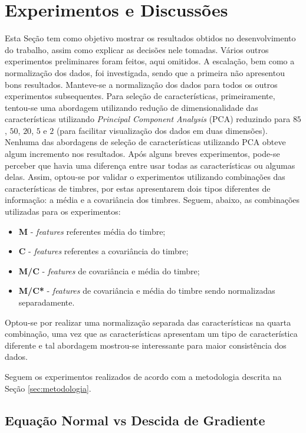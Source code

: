 \documentclass[conference]{IEEEtran}
\begin{document}
\section{Experimentos e Discussões} \label{sec:exp}

Esta Seção tem como objetivo mostrar os resultados obtidos no desenvolvimento do trabalho, assim como explicar as decisões nele tomadas. Vários outros experimentos preliminares foram feitos, aqui omitidos. A escalação, bem como a normalização dos dados, foi investigada, sendo que a primeira não apresentou bons resultados. Manteve-se a normalização dos dados para todos os outros experimentos subsequentes. Para seleção de características, primeiramente, tentou-se uma abordagem utilizando redução de dimensionalidade das características utilizando \textit{Principal Component Analysis} (PCA) reduzindo para $85$, $50$, $20$, $5$ e $2$ (para facilitar visualização dos dados em duas dimensões). Nenhuma das abordagens de seleção de características utilizando PCA obteve algum incremento nos resultados. Após alguns breves experimentos, pode-se perceber que havia uma diferença entre usar todas as características ou algumas delas. Assim, optou-se por validar o experimentos utilizando combinações das características de timbres, por estas apresentarem dois tipos diferentes de informação: a média e a covariância dos timbres. Seguem, abaixo, as combinações utilizadas para os experimentos:

\begin{itemize}
	\item \textbf{M} - \emph{features} referentes média do timbre;
	\item \textbf{C} - \emph{features} referentes a covariância do timbre;
	\item \textbf{M/C} - \emph{features} de covariância e média do timbre;
	\item \textbf{M/C*} - \emph{features} de covariância e média do timbre sendo normalizadas separadamente.
\end{itemize}

Optou-se por realizar uma normalização separada das características na quarta combinação, uma vez que as características apresentam um tipo de característica diferente e tal abordagem mostrou-se interessante para maior consistência dos dados.

Seguem os experimentos realizados de acordo com a metodologia descrita na Seção \ref{sec:metodologia}.

\subsection{Equação Normal vs Descida de Gradiente}
\end{document}
